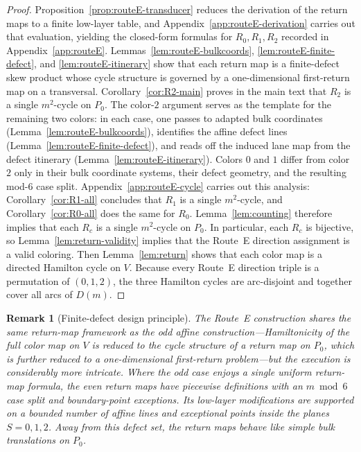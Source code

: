 \documentclass[11pt]{article}
\newtheorem{remark}{Remark}
\begin{document}
\begin{proof}
Proposition~\ref{prop:routeE-transducer} reduces the derivation of the return maps to a finite low-layer table, and Appendix~\ref{app:routeE-derivation} carries out that evaluation, yielding the closed-form formulas for $R_0,R_1,R_2$ recorded in Appendix~\ref{app:routeE}.
Lemmas~\ref{lem:routeE-bulkcoords}, \ref{lem:routeE-finite-defect}, and \ref{lem:routeE-itinerary} show that each return map is a finite-defect skew product whose cycle structure is governed by a one-dimensional first-return map on a transversal.
Corollary~\ref{cor:R2-main} proves in the main text that $R_2$ is a single $m^2$-cycle on $P_0$.
The color-$2$ argument serves as the template for the remaining two colors: in each case, one passes to adapted bulk coordinates (Lemma~\ref{lem:routeE-bulkcoords}), identifies the affine defect lines (Lemma~\ref{lem:routeE-finite-defect}), and reads off the induced lane map from the defect itinerary (Lemma~\ref{lem:routeE-itinerary}).
Colors $0$ and $1$ differ from color $2$ only in their bulk coordinate systems, their defect geometry, and the resulting mod-$6$ case split.
Appendix~\ref{app:routeE-cycle} carries out this analysis: Corollary~\ref{cor:R1-all} concludes that $R_1$ is a single $m^2$-cycle, and Corollary~\ref{cor:R0-all} does the same for $R_0$.
Lemma~\ref{lem:counting} therefore implies that each $R_c$ is a single $m^2$-cycle on $P_0$.
In particular, each $R_c$ is bijective, so Lemma~\ref{lem:return-validity} implies that the Route~E direction assignment is a valid coloring.
Then Lemma~\ref{lem:return} shows that each color map is a directed Hamilton cycle on $V$.
Because every Route~E direction triple is a permutation of $(0,1,2)$, the three Hamilton cycles are arc-disjoint and together cover all arcs of $D(m)$.
\end{proof}


\begin{remark}[Finite-defect design principle]
The Route~E construction shares the same return-map framework as the odd affine construction---Hamiltonicity of the full color map on $V$ is reduced to the cycle structure of a return map on $P_0$, which is further reduced to a one-dimensional first-return problem---but the execution is considerably more intricate.
Where the odd case enjoys a single uniform return-map formula, the even return maps have piecewise definitions with an $m\bmod 6$ case split and boundary-point exceptions.
Its low-layer modifications are supported on a bounded number of affine lines and exceptional points inside the planes $S=0,1,2$.
Away from this defect set, the return maps behave like simple bulk translations on $P_0$.
\end{remark}
\end{document}
